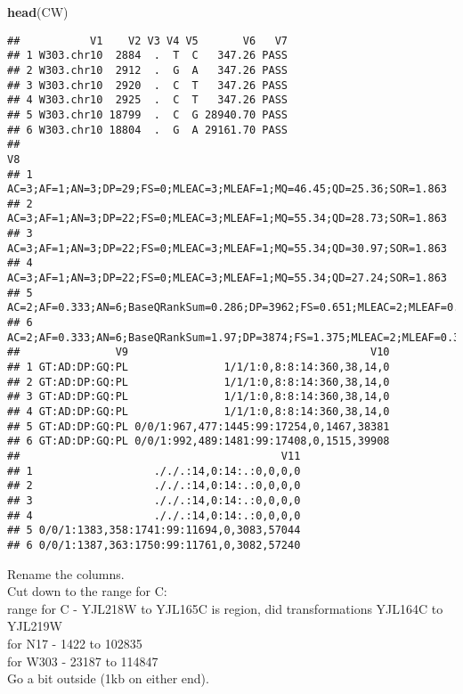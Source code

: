 \documentclass[
]{article}
\newenvironment{Shaded}{\begin{snugshade}}{\end{snugshade}}
\newcommand{\FunctionTok}[1]{\textcolor[rgb]{0.13,0.29,0.53}{\textbf{#1}}}
\newcommand{\NormalTok}[1]{#1}
\begin{document}
\begin{Shaded}
\begin{Highlighting}[]
\FunctionTok{head}\NormalTok{(CW)}
\end{Highlighting}
\end{Shaded}

\begin{verbatim}
##           V1    V2 V3 V4 V5       V6   V7
## 1 W303.chr10  2884  .  T  C   347.26 PASS
## 2 W303.chr10  2912  .  G  A   347.26 PASS
## 3 W303.chr10  2920  .  C  T   347.26 PASS
## 4 W303.chr10  2925  .  C  T   347.26 PASS
## 5 W303.chr10 18799  .  C  G 28940.70 PASS
## 6 W303.chr10 18804  .  G  A 29161.70 PASS
##                                                                                                                                           V8
## 1                                                                      AC=3;AF=1;AN=3;DP=29;FS=0;MLEAC=3;MLEAF=1;MQ=46.45;QD=25.36;SOR=1.863
## 2                                                                      AC=3;AF=1;AN=3;DP=22;FS=0;MLEAC=3;MLEAF=1;MQ=55.34;QD=28.73;SOR=1.863
## 3                                                                      AC=3;AF=1;AN=3;DP=22;FS=0;MLEAC=3;MLEAF=1;MQ=55.34;QD=30.97;SOR=1.863
## 4                                                                      AC=3;AF=1;AN=3;DP=22;FS=0;MLEAC=3;MLEAF=1;MQ=55.34;QD=27.24;SOR=1.863
## 5 AC=2;AF=0.333;AN=6;BaseQRankSum=0.286;DP=3962;FS=0.651;MLEAC=2;MLEAF=0.333;MQ=59.66;MQRankSum=-5.382;QD=9.09;ReadPosRankSum=1.88;SOR=0.599
## 6  AC=2;AF=0.333;AN=6;BaseQRankSum=1.97;DP=3874;FS=1.375;MLEAC=2;MLEAF=0.333;MQ=59.73;MQRankSum=-5.758;QD=9.03;ReadPosRankSum=1.58;SOR=0.575
##               V9                                      V10
## 1 GT:AD:DP:GQ:PL               1/1/1:0,8:8:14:360,38,14,0
## 2 GT:AD:DP:GQ:PL               1/1/1:0,8:8:14:360,38,14,0
## 3 GT:AD:DP:GQ:PL               1/1/1:0,8:8:14:360,38,14,0
## 4 GT:AD:DP:GQ:PL               1/1/1:0,8:8:14:360,38,14,0
## 5 GT:AD:DP:GQ:PL 0/0/1:967,477:1445:99:17254,0,1467,38381
## 6 GT:AD:DP:GQ:PL 0/0/1:992,489:1481:99:17408,0,1515,39908
##                                         V11
## 1                   ././.:14,0:14:.:0,0,0,0
## 2                   ././.:14,0:14:.:0,0,0,0
## 3                   ././.:14,0:14:.:0,0,0,0
## 4                   ././.:14,0:14:.:0,0,0,0
## 5 0/0/1:1383,358:1741:99:11694,0,3083,57044
## 6 0/0/1:1387,363:1750:99:11761,0,3082,57240
\end{verbatim}

Rename the columns.\\
Cut down to the range for C:\\
range for C - YJL218W to YJL165C is region, did transformations YJL164C
to YJL219W\\
for N17 - 1422 to 102835\\
for W303 - 23187 to 114847\\
Go a bit outside (1kb on either end).
\end{document}
